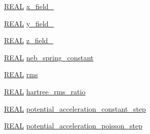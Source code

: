 \begin{DoxyCompactItemize}
\item 
\hyperlink{md_8h_a4b654506f18b8bfd61ad2a29a7e38c25}{R\-E\-A\-L} \hyperlink{struct_c_o_n_t_r_o_l_a480ba202e721c3ff3c245f19af2942bf}{x\-\_\-field\-\_}
\item 
\hyperlink{md_8h_a4b654506f18b8bfd61ad2a29a7e38c25}{R\-E\-A\-L} \hyperlink{struct_c_o_n_t_r_o_l_a48f56534d08dbebb1b25e1a84c20189d}{y\-\_\-field\-\_}
\item 
\hyperlink{md_8h_a4b654506f18b8bfd61ad2a29a7e38c25}{R\-E\-A\-L} \hyperlink{struct_c_o_n_t_r_o_l_a6fdcc6ad48ad725bbc0539061555faf0}{z\-\_\-field\-\_}
\item 
\hyperlink{md_8h_a4b654506f18b8bfd61ad2a29a7e38c25}{R\-E\-A\-L} \hyperlink{struct_c_o_n_t_r_o_l_a4442d6c0ac4bbc60f23cc668e7e60a17}{neb\-\_\-spring\-\_\-constant}
\item 
\hyperlink{md_8h_a4b654506f18b8bfd61ad2a29a7e38c25}{R\-E\-A\-L} \hyperlink{struct_c_o_n_t_r_o_l_aa889e2e03322b6b85e872895d95109e1}{rms}
\item 
\hyperlink{md_8h_a4b654506f18b8bfd61ad2a29a7e38c25}{R\-E\-A\-L} \hyperlink{struct_c_o_n_t_r_o_l_a7e295bc2ee5135ee4cb2c03507646f0f}{hartree\-\_\-rms\-\_\-ratio}
\item 
\hyperlink{md_8h_a4b654506f18b8bfd61ad2a29a7e38c25}{R\-E\-A\-L} \hyperlink{struct_c_o_n_t_r_o_l_a1851b59a5886a570295d133b4c434aaa}{potential\-\_\-acceleration\-\_\-constant\-\_\-step}
\item 
\hyperlink{md_8h_a4b654506f18b8bfd61ad2a29a7e38c25}{R\-E\-A\-L} \hyperlink{struct_c_o_n_t_r_o_l_a76aa4f22434d3fe003c78c61a3285d40}{potential\-\_\-acceleration\-\_\-poisson\-\_\-step}
\end{DoxyCompactItemize}


